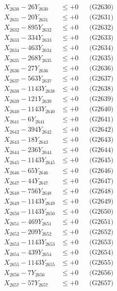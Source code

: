 \documentclass[a4paper,10pt]{article}
\begin{document}
{\begin{align}
X_{2630} - 26Y_{2630} &\leq +0 && \text{(G2630)} \\
\allowbreak
X_{2631} - 20Y_{2631} &\leq +0 && \text{(G2631)} \\
X_{2632} - 895Y_{2632} &\leq +0 && \text{(G2632)} \\
X_{2633} - 334Y_{2633} &\leq +0 && \text{(G2633)} \\
X_{2634} - 463Y_{2634} &\leq +0 && \text{(G2634)} \\
X_{2635} - 268Y_{2635} &\leq +0 && \text{(G2635)} \\
X_{2636} - 27Y_{2636} &\leq +0 && \text{(G2636)} \\
X_{2637} - 563Y_{2637} &\leq +0 && \text{(G2637)} \\
X_{2638} - 1143Y_{2638} &\leq +0 && \text{(G2638)} \\
X_{2639} - 121Y_{2639} &\leq +0 && \text{(G2639)} \\
X_{2640} - 1143Y_{2640} &\leq +0 && \text{(G2640)} \\
\allowbreak
X_{2641} - 6Y_{2641} &\leq +0 && \text{(G2641)} \\
X_{2642} - 394Y_{2642} &\leq +0 && \text{(G2642)} \\
X_{2643} - 18Y_{2643} &\leq +0 && \text{(G2643)} \\
X_{2644} - 236Y_{2644} &\leq +0 && \text{(G2644)} \\
X_{2645} - 1143Y_{2645} &\leq +0 && \text{(G2645)} \\
X_{2646} - 65Y_{2646} &\leq +0 && \text{(G2646)} \\
X_{2647} - 44Y_{2647} &\leq +0 && \text{(G2647)} \\
X_{2648} - 756Y_{2648} &\leq +0 && \text{(G2648)} \\
X_{2649} - 1143Y_{2649} &\leq +0 && \text{(G2649)} \\
X_{2650} - 1143Y_{2650} &\leq +0 && \text{(G2650)} \\
\allowbreak
X_{2651} - 469Y_{2651} &\leq +0 && \text{(G2651)} \\
X_{2652} - 209Y_{2652} &\leq +0 && \text{(G2652)} \\
X_{2653} - 1143Y_{2653} &\leq +0 && \text{(G2653)} \\
X_{2654} - 439Y_{2654} &\leq +0 && \text{(G2654)} \\
X_{2655} - 1143Y_{2655} &\leq +0 && \text{(G2655)} \\
X_{2656} - 7Y_{2656} &\leq +0 && \text{(G2656)} \\
X_{2657} - 57Y_{2657} &\leq +0 && \text{(G2657)} \\

\end{align}}
\end{document}
